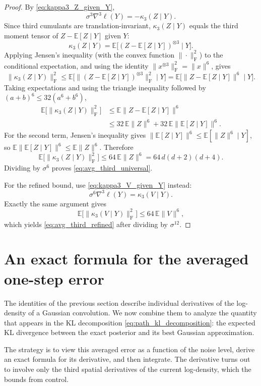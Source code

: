\documentclass[11pt]{article}
\def\E{\mathbb{E}}
\newcommand{\norm}[1]{\|#1\|}
\newcommand{\frobnorm}[1]{\|#1\|_{\mathrm{F}}}
\begin{document}
\begin{proof}
By \eqref{eq:kappa3_Z_given_Y},
\[
\sigma^3\nabla^3\ell(Y) = -\kappa_3(Z\mid Y).
\]
Since third cumulants are translation-invariant, \(\kappa_3(Z\mid Y)\) equals the third moment tensor of \(Z-\E[Z\mid Y]\) given \(Y\):
\[
\kappa_3(Z\mid Y)
=
\E\big[(Z-\E[Z\mid Y])^{\otimes 3}\mid Y\big].
\]
Applying Jensen's inequality (with the convex function \(\frobnorm{\cdot}^2\)) to the conditional expectation, and using the identity \(\frobnorm{x^{\otimes 3}}^2=\norm{x}^6\), gives
\[
\frobnorm{\kappa_3(Z\mid Y)}^2
\le
\E\big[\frobnorm{(Z-\E[Z\mid Y])^{\otimes 3}}^2\mid Y\big]
=
\E\big[\norm{Z-\E[Z\mid Y]}^6\mid Y\big].
\]
Taking expectations and using the triangle inequality followed by \((a+b)^6\le 32(a^6+b^6)\),
\begin{align*}
\E\big[\frobnorm{\kappa_3(Z\mid Y)}^2\big]
&\le
\E\norm{Z-\E[Z\mid Y]}^6 \\
&\le 32\,\E\norm{Z}^6 + 32\,\E\norm{\E[Z\mid Y]}^6.
\end{align*}
For the second term, Jensen's inequality gives \(\norm{\E[Z\mid Y]}^6\le \E[\norm{Z}^6\mid Y]\), so \(\E\norm{\E[Z\mid Y]}^6\le \E\norm{Z}^6\). Therefore
\[
\E\big[\frobnorm{\kappa_3(Z\mid Y)}^2\big]
\le 64\,\E\norm{Z}^6
= 64\,d(d+2)(d+4).
\]
Dividing by \(\sigma^6\) proves \eqref{eq:avg_third_universal}.

For the refined bound, use \eqref{eq:kappa3_V_given_Y} instead:
\[
\sigma^6\nabla^3\ell(Y)=\kappa_3(V\mid Y).
\]
Exactly the same argument gives
\[
\E\big[\frobnorm{\kappa_3(V\mid Y)}^2\big]
\le 64\,\E\norm{V}^6,
\]
which yields \eqref{eq:avg_third_refined} after dividing by \(\sigma^{12}\).
\end{proof}

\section{An exact formula for the averaged one-step error}
\label{sec:one_step_formula}

The identities of the previous section describe individual derivatives of the log-density of a Gaussian convolution. We now combine them to analyze the quantity that appears in the KL decomposition \eqref{eq:path_kl_decomposition}: the expected KL divergence between the exact posterior and its best Gaussian approximation.

The strategy is to view this averaged error as a function of the noise level, derive an exact formula for its derivative, and then integrate. The derivative turns out to involve only the third spatial derivatives of the current log-density, which the bounds from  control.
\end{document}
